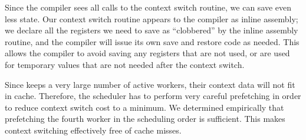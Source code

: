 Since the compiler sees all calls to the context switch routine, we
can save even less state. Our context switch routine appears to the
compiler as inline assembly; we declare all the registers we need
to save as ``clobbered'' by the inline assembly routine, and the
compiler will issue its own save and restore code as needed. This allows the
compiler to avoid saving any registers that are not used, or are used
for temporary values that are not needed after the context switch.

Since \Grappa keeps a very large number of active workers, their context data will not fit in cache. Therefore, the scheduler has to perform very careful prefetching in order to reduce context switch cost to a minimum. We determined empirically that prefetching the fourth worker in the scheduling order is sufficient. This makes context switching effectively free of cache misses. 

% 
% 
% 







